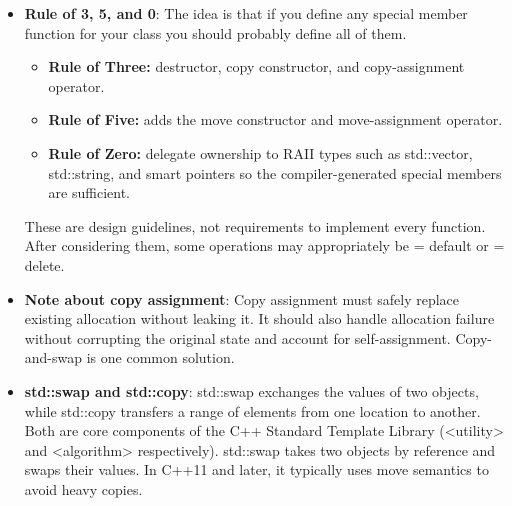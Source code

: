 \documentclass{report}
\begin{document}
\begin{itemize}
\begin{enumerate}
\begin{cppcode}
                        AnonymousLambdaClosure my_lambda(x);
                    \end{cppcode}
                    \bigbreak \noindent 
                    Because operator() is a const member function, it is illegal to modify any of the class's internal member variables (like x) inside the function body.
                    \bigbreak \noindent 
                    In functional programming, a lambda is conceptually treated as a pure, stateless function execution block rather than a stateful object. Making the execution operator const aligns lambdas with this philosophy, ensuring that calling a lambda multiple times yields predictable behavior unless you explicitly opt into statefulness using mutable.
            \end{enumerate}
        \item \textbf{Rule of 3, 5, and 0}: The idea is that if you define any special member function for your class you should probably define all of them.
            \begin{itemize}
                \item \textbf{Rule of Three:} destructor, copy constructor, and copy-assignment operator.
                \item \textbf{Rule of Five:} adds the move constructor and move-assignment operator.
                \item \textbf{Rule of Zero:} delegate ownership to RAII types such as std::vector, std::string, and smart pointers so the compiler-generated special members are sufficient.
            \end{itemize}
            These are design guidelines, not requirements to implement every function. After considering them, some operations may appropriately be = default or = delete.
        \item \textbf{Note about copy assignment}: Copy assignment must safely replace existing allocation without leaking it. It should also handle allocation failure without corrupting the original state and account for self-assignment. Copy-and-swap is one common solution.
        \item \textbf{std::swap and std::copy}:  std::swap exchanges the values of two objects, while std::copy transfers a range of elements from one location to another. Both are core components of the C++ Standard Template Library (<utility> and <algorithm> respectively).
            \bigbreak \noindent 
            std::swap takes two objects by reference and swaps their values. In C++11 and later, it typically uses move semantics to avoid heavy copies.

\end{itemize}
\end{document}
